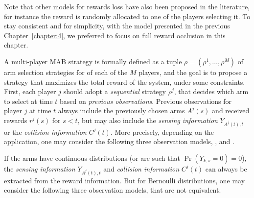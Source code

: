 Note that other models for rewards loss have also been proposed in the literature, for instance the reward is randomly allocated to one of the players selecting it.
To stay consistent and for simplicity, with the model presented in the previous Chapter~\ref{chapter:4},
we preferred to focus on full reward occlusion in this chapter.


A multi-player MAB strategy is formally defined as a tuple $\rho = (\rho^1,\dots,\rho^M)$ of arm selection strategies for of each of the $M$ players, and the goal is to propose a strategy that maximizes the total reward of the system, under some constraints.
First, each player $j$ should adopt a \emph{sequential} strategy $\rho^j$, that decides which arm to select at time $t$ based on \emph{previous observations}.
Previous observations for player $j$ at time $t$ always include the previously chosen arms $A^j(s)$ and received rewards $r^j(s)$ for $s<t$, but may also include the \emph{sensing information} $Y_{A^j(t),t}$ or the \emph{collision information} $C^j(t)$.
More precisely, depending on the application, one may consider the following three observation models, \modelun, \modeldeux{} and \modeltrois.

If the arms have continuous distributions (or are such that  $\Pr(Y_{k,s}=0)=0$), the \emph{sensing information} $Y_{A^j(t),t}$ and \emph{collision information} $C^j(t)$ can always be extracted from the reward information.
But for Bernoulli distributions, one may consider the following three observation models, that are not equivalent:

